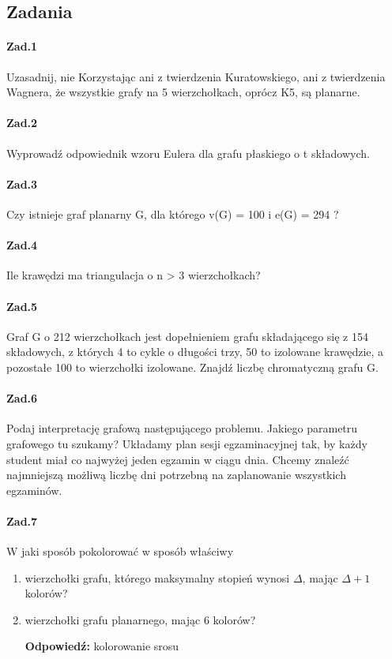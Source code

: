 \subsection{Zadania}
\paragraph{Zad.1} Uzasadnij, nie Korzystając ani z twierdzenia Kuratowskiego, ani z twierdzenia Wagnera, że wszystkie grafy na 5 wierzchołkach, oprócz K5, są planarne.

\paragraph{Zad.2} Wyprowadź odpowiednik wzoru Eulera dla grafu płaskiego o t składowych.

\paragraph{Zad.3} Czy istnieje graf planarny G, dla którego v(G) = 100 i e(G) = 294 ?

\paragraph{Zad.4} Ile krawędzi ma triangulacja o n > 3 wierzchołkach?

\paragraph{Zad.5} Graf G o 212 wierzchołkach jest dopełnieniem grafu składającego się z 154 składowych, z których 4 to cykle o długości trzy, 50 to izolowane krawędzie, a pozostałe 100 to wierzchołki izolowane. Znajdź liczbę chromatyczną grafu G.

\paragraph{Zad.6} Podaj interpretację grafową następującego problemu. Jakiego parametru grafowego tu szukamy?
Układamy plan sesji egzaminacyjnej tak, by każdy student miał co najwyżej jeden egzamin w ciągu dnia. Chcemy znaleźć najmniejszą możliwą liczbę dni potrzebną na zaplanowanie wszystkich egzaminów.

\paragraph{Zad.7} W jaki sposób pokolorować w sposób właściwy
\begin{enumerate}[label=\alph*)]
\item wierzchołki grafu, którego maksymalny stopień wynosi $\Delta $, mając $\Delta +1$ kolorów?
\item wierzchołki grafu planarnego, mając 6 kolorów?

\textbf{Odpowiedź: }kolorowanie srosu
\end{enumerate}
